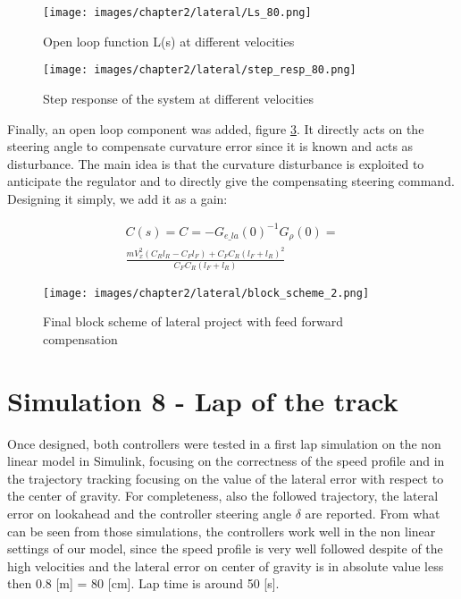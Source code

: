 \documentclass{report}
\let\Oldsection\section
\renewcommand{\section}{\FloatBarrier\Oldsection}
\begin{document}
\begin{figure}[h!]
    \centering
    \texttt{[image: images/chapter2/lateral/Ls\_80.png]}
    \caption{Open loop function L(s) at different velocities}
    \label{fig:latController_Ls}
\end{figure}

\begin{figure}[h!]
    \centering
    \texttt{[image: images/chapter2/lateral/step\_resp\_80.png]}
    \caption{Step response of the system at different velocities}
    \label{fig:latController_stepResp}
\end{figure}

Finally, an open loop component was added, figure \ref{fig:latController_blockscheme2}. It directly acts on the steering angle to compensate curvature error since it is known and acts as disturbance. The main idea is that the curvature disturbance is exploited to anticipate the regulator and to directly give the compensating steering command. Designing it simply, we add it as a gain: 

\begin{equation*}
\begin{aligned}
C(s) = C = - G_{e\_la}(0)^{-1} G_\rho(0) = \\ \frac{m V_x^2 (C_R l_R - C_F l_F) + C_F C_R (l_F+l_R)^2}{C_F C_R (l_F + l_R)}
\end{aligned}
\end{equation*}

\begin{figure}[h!]
    \centering
    \texttt{[image: images/chapter2/lateral/block\_scheme\_2.png]}
    \caption{Final block scheme of lateral project with feed forward compensation}
    \label{fig:latController_blockscheme2}
\end{figure}

\section{Simulation 8 - Lap of the track}
Once designed, both controllers were tested in a first lap simulation on the non linear model in Simulink, focusing on the correctness of the speed profile and in the trajectory tracking focusing on the value of the lateral error with respect to the center of gravity. For completeness, also the followed trajectory, the lateral error on lookahead and the controller steering angle $\delta$ are reported. From what can be seen from those simulations, the controllers work well in the non linear settings of our model, since the speed profile is very well followed despite of the high velocities and the lateral error on center of gravity is in absolute value less then 0.8 [m] = 80 [cm]. Lap time is around 50 [s].
\end{document}
